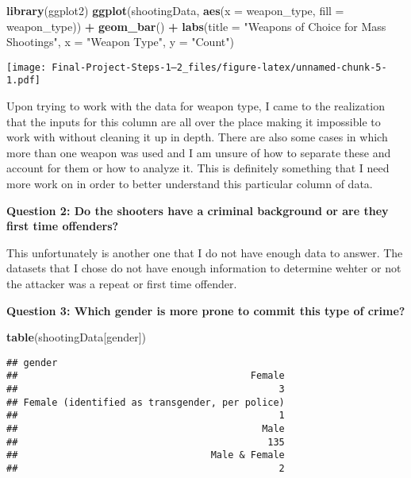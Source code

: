 \documentclass[
]{article}
\newenvironment{Shaded}{\begin{snugshade}}{\end{snugshade}}
\newcommand{\AttributeTok}[1]{\textcolor[rgb]{0.13,0.29,0.53}{#1}}
\newcommand{\FunctionTok}[1]{\textcolor[rgb]{0.13,0.29,0.53}{\textbf{#1}}}
\newcommand{\NormalTok}[1]{#1}
\newcommand{\SpecialCharTok}[1]{\textcolor[rgb]{0.81,0.36,0.00}{\textbf{#1}}}
\newcommand{\StringTok}[1]{\textcolor[rgb]{0.31,0.60,0.02}{#1}}
\begin{document}
\begin{Shaded}
\begin{Highlighting}[]
\FunctionTok{library}\NormalTok{(ggplot2)}
\FunctionTok{ggplot}\NormalTok{(shootingData, }\FunctionTok{aes}\NormalTok{(}\AttributeTok{x =}\NormalTok{ weapon\_type, }\AttributeTok{fill =}\NormalTok{ weapon\_type)) }\SpecialCharTok{+} \FunctionTok{geom\_bar}\NormalTok{() }\SpecialCharTok{+} 
  \FunctionTok{labs}\NormalTok{(}\AttributeTok{title =} \StringTok{"Weapons of Choice for Mass Shootings"}\NormalTok{, }
       \AttributeTok{x =} \StringTok{"Weapon Type"}\NormalTok{, }\AttributeTok{y =} \StringTok{"Count"}\NormalTok{)}
\end{Highlighting}
\end{Shaded}

\texttt{[image: Final-Project-Steps-1---2\_files/figure-latex/unnamed-chunk-5-1.pdf]}

Upon trying to work with the data for weapon type, I came to the
realization that the inputs for this column are all over the place
making it impossible to work with without cleaning it up in depth. There
are also some cases in which more than one weapon was used and I am
unsure of how to separate these and account for them or how to analyze
it. This is definitely something that I need more work on in order to
better understand this particular column of data.

\textbf{Question 2: Do the shooters have a criminal background or are
they first time offenders?}

This unfortunately is another one that I do not have enough data to
answer. The datasets that I chose do not have enough information to
determine wehter or not the attacker was a repeat or first time
offender.

\textbf{Question 3: Which gender is more prone to commit this type of
crime?}

\begin{Shaded}
\begin{Highlighting}[]
\FunctionTok{table}\NormalTok{(shootingData[}\StringTok{\textquotesingle{}gender\textquotesingle{}}\NormalTok{])}
\end{Highlighting}
\end{Shaded}

\begin{verbatim}
## gender
##                                         Female 
##                                              3 
## Female (identified as transgender, per police) 
##                                              1 
##                                           Male 
##                                            135 
##                                  Male & Female 
##                                              2
\end{verbatim}
\end{document}

